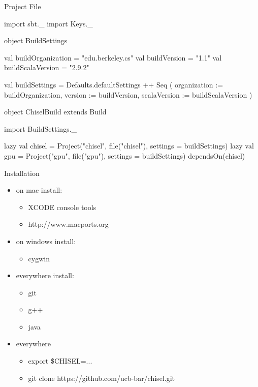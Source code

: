 \documentclass[xcolor=pdflatex,dvipsnames,table]{beamer}
\begin{document}
\begin{frame}[fragile]{Project File}

{
\begin{scala}
import sbt._
import Keys._

object BuildSettings {
  val buildOrganization = "edu.berkeley.cs"
  val buildVersion = "1.1"
  val buildScalaVersion = "2.9.2"

  val buildSettings = Defaults.defaultSettings ++ Seq (
    organization := buildOrganization,
    version      := buildVersion,
    scalaVersion := buildScalaVersion
  )
}

object ChiselBuild extends Build {
  import BuildSettings._

  lazy val chisel = 
    Project("chisel", file("chisel"), 
      settings = buildSettings)
  lazy val gpu =
    Project("gpu", file("gpu"), settings = buildSettings) 
      dependsOn(chisel)
}
\end{scala}
}

\end{frame}

\begin{frame}[fragile]{Installation}
\begin{itemize}
\item on mac install:
\begin{itemize}
\item XCODE console tools
\item http://www.macports.org
\end{itemize}
\item on windows install:
\begin{itemize}
\item cygwin
\end{itemize}
\item everywhere install:
\begin{itemize}
\item git
\item g++
\item java
\end{itemize}
\item everywhere
\begin{itemize}
\item export \$CHISEL=...
\item git clone https://github.com/ucb-bar/chisel.git
\end{itemize}
\end{itemize}

\end{frame}
\end{document}

